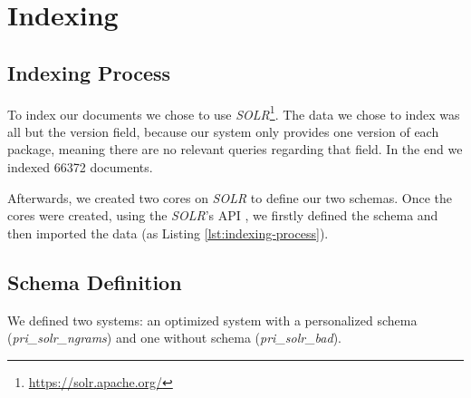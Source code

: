 \section{Indexing}

\subsection{Indexing Process}

To index our documents we chose to use \emph{SOLR}\footnote{\url{https://solr.apache.org/}}. The data we chose to index was all but the version field, because our system only provides one version of each package, meaning there are no relevant queries regarding that field. In the end we indexed 66372 documents.

Afterwards, we created two cores on \emph{SOLR} to define our two schemas. Once the cores were created, using the \emph{SOLR}'s API , we firstly defined the schema and then imported the data (as Listing \ref{lst:indexing-process}).



\subsection{Schema Definition}

We defined two systems: an optimized system with a personalized schema (\emph{pri\_solr\_ngrams}) and one without schema (\emph{pri\_solr\_bad}). 

